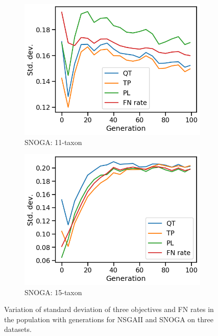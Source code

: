 \begin{figure}[!htbp]
\begin{adjustwidth}{-1cm}{-1cm}
\begin{subfigure}[b]{0.4\textwidth}
			\includegraphics[width=\textwidth]{Figure/11-taxon_NOSSGA_std_dev}
			\caption{SNOGA: 11-taxon}
		\end{subfigure}%
		\begin{subfigure}[b]{0.4\textwidth}
			\includegraphics[width=\textwidth]{Figure/15-taxon_NOSSGA_std_dev}
			\caption{SNOGA: 15-taxon}
		\end{subfigure}
		\caption{Variation of standard deviation of three objectives and FN rates in the population with generations for NSGAII and SNOGA on three datasets.
		}
		\label{fig:gen_wise_std_dev}
	\end{adjustwidth}
\end{figure}

